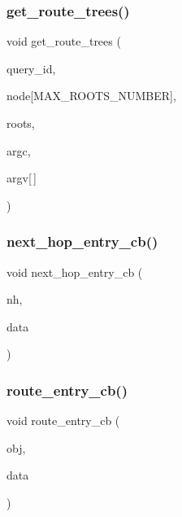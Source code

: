 \subsubsection{\texorpdfstring{get\+\_\+route\+\_\+trees()}{get\_route\_trees()}}
{\footnotesize\ttfamily void get\+\_\+route\+\_\+trees (\begin{DoxyParamCaption}\item[{enum \hyperlink{route-tree_8c_aed8cdbb52dbe32c343a8c26887888e7f}{R\+O\+U\+T\+E\+\_\+\+Q\+U\+E\+RY}}]{query\+\_\+id,  }\item[{G\+Node $\ast$}]{node\mbox{[}\+M\+A\+X\+\_\+\+R\+O\+O\+T\+S\+\_\+\+N\+U\+M\+B\+E\+R\mbox{]},  }\item[{int $\ast$}]{roots,  }\item[{int}]{argc,  }\item[{char $\ast$}]{argv\mbox{[}$\,$\mbox{]} }\end{DoxyParamCaption})}

\mbox{\label{route-tree_8c_a8402c2baca9819b3791b35b6c1645ce6}} 
\subsubsection{\texorpdfstring{next\+\_\+hop\+\_\+entry\+\_\+cb()}{next\_hop\_entry\_cb()}}
{\footnotesize\ttfamily void next\+\_\+hop\+\_\+entry\+\_\+cb (\begin{DoxyParamCaption}\item[{struct rtnl\+\_\+nexthop $\ast$}]{nh,  }\item[{void $\ast$}]{data }\end{DoxyParamCaption})}

\mbox{\label{route-tree_8c_a112b373b8e4a4a0eacfba3cc078e5ce2}} 
\subsubsection{\texorpdfstring{route\+\_\+entry\+\_\+cb()}{route\_entry\_cb()}}
{\footnotesize\ttfamily void route\+\_\+entry\+\_\+cb (\begin{DoxyParamCaption}\item[{struct nl\+\_\+object $\ast$}]{obj,  }\item[{void $\ast$}]{data }\end{DoxyParamCaption})}

